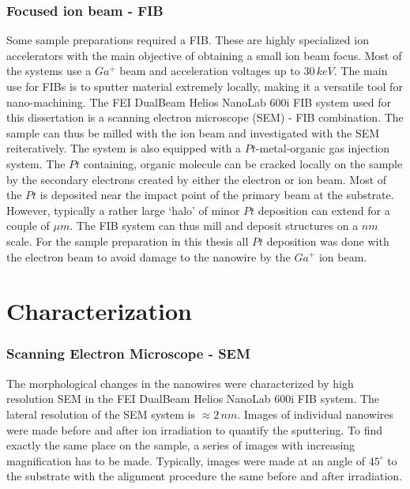 \subsubsection{Focused ion beam - FIB}

Some sample preparations required a FIB. These are highly specialized ion accelerators with the main objective of obtaining a small ion beam focus. Most of the systems use a $Ga^+$ beam and acceleration voltages up to $30\,keV$. The main use for FIBs is to sputter material extremely locally, making it a versatile tool for nano-machining. The FEI DualBeam Helios NanoLab 600i FIB system used for this dissertation is a scanning electron microscope (SEM) - FIB combination. The sample can thus be milled with the ion beam and investigated with the SEM reiteratively. The system is also equipped with a $Pt$-metal-organic gas injection system. The $Pt$ containing, organic molecule can be cracked locally on the sample by the secondary electrons created by either the electron or ion beam. Most of the $Pt$ is deposited near the impact point of the primary beam at the substrate. However, typically a rather large `halo' of minor $Pt$ deposition can extend for a couple of $\mu m$. The FIB system can thus mill and deposit structures on a $nm$ scale. For the sample preparation in this thesis all $Pt$ deposition was done with the electron beam to avoid damage to the nanowire by the $Ga^+$ ion beam.

\section{Characterization}

\subsubsection{Scanning Electron Microscope - SEM}

The morphological changes in the nanowires were characterized by high resolution SEM in the FEI DualBeam Helios NanoLab 600i FIB system. The lateral resolution of the SEM system is $\approx 2\,nm$. Images of individual nanowires were made before and after ion irradiation to quantify the sputtering. To find exactly the same place on the sample, a series of images with increasing magnification has to be made. Typically, images were made at an angle of $45^\circ$ to the substrate with the alignment procedure the same before and after irradiation.


